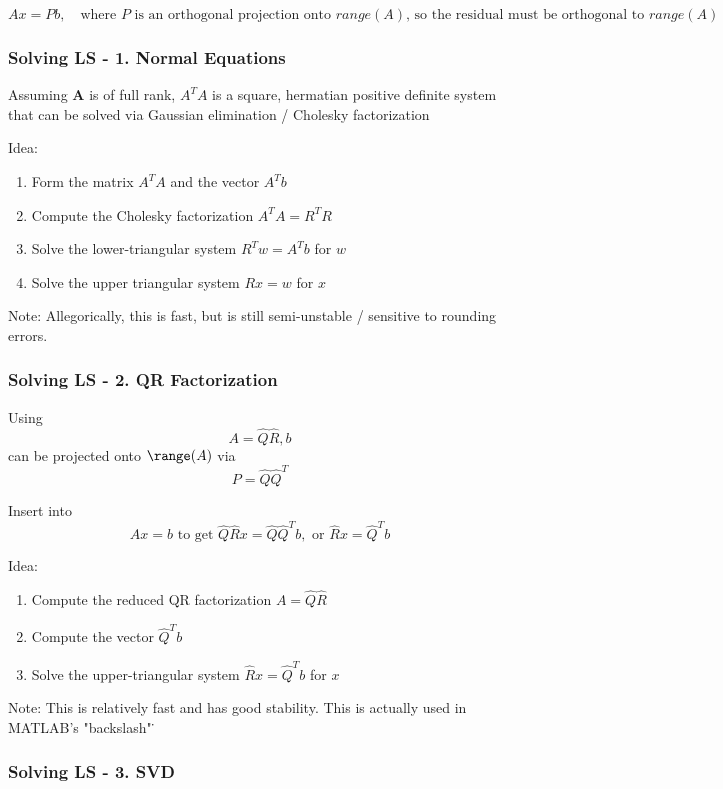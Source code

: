 \documentclass{article}
\begin{document}
$$
Ax = Pb, \quad \text{where } P \text{ is an orthogonal projection onto } range(A) \text{, so the residual must be orthogonal to } range(A)
$$

\subsubsection{Solving LS - 1. Normal Equations}
Assuming \textbf{A} is of full rank, $A^{T}A$ is a square, hermatian positive definite system that can be solved via Gaussian elimination / Cholesky factorization

Idea:
\begin{enumerate}

    \item {Form the matrix $A^{T}A$ and the vector $A^{T}b$}
    \item {Compute the Cholesky factorization $A^{T}A = R^{T}R$}
    \item {Solve the lower-triangular system $R^{T}w=A^{T}b$ for $w$}
    \item {Solve the upper triangular system $Rx = w$ for $x$}
\end{enumerate}

\newline
Note: Allegorically, this is fast, but is still semi-unstable / sensitive to rounding errors.
\subsubsection{Solving LS - 2. QR Factorization}
Using $$A=\hat{Q}\hat{R}, b$$ can be projected onto $\range(A)$ via 
$$
P=\hat{Q}\hat{Q}^{T}
$$

Insert into $$Ax =b \text{ to get } \hat{Q}\hat{R}x=\hat{Q}\hat{Q}^{T}b, \text{ or } \hat{R}x = \hat{Q}^{T}b$$


Idea:
\begin{enumerate}

    \item {Compute the reduced QR factorization $A=\hat{Q}\hat{R}$}
    \item {Compute the vector $\hat{Q}^{T}b$}
    \item {Solve the upper-triangular system $\hat{R}x=\hat{Q}^{T}b$ for $x$}
\end{enumerate}
Note: This is relatively fast and has good stability. This is actually used in MATLAB's "backslash" \.

\subsubsection{Solving LS - 3. SVD}
\end{document}
